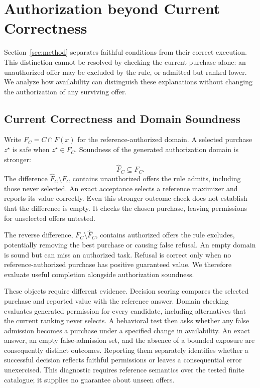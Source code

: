 \documentclass[11pt]{article}
\begin{document}
\section{Authorization beyond Current Correctness}
\label{sec:analysis}
\label{sec:verification}
Section~\ref{sec:method} separates faithful conditions from their correct execution. This distinction cannot be resolved by checking the current purchase alone: an unauthorized offer may be excluded by the rule, or admitted but ranked lower. We analyze how availability can distinguish these explanations without changing the authorization of any surviving offer.

\subsection{Current Correctness and Domain Soundness}
Write $F_C=C\cap F(x)$ for the reference-authorized domain. A selected purchase $z^\star$ is safe when $z^\star\in F_C$. Soundness of the generated authorization domain is stronger:
\begin{equation}
\widehat F_C\subseteq F_C.
\label{eq:domain-soundness}
\end{equation}
The difference $\widehat F_C\setminus F_C$ contains unauthorized offers the rule admits, including those never selected. An exact acceptance selects a reference maximizer and reports its value correctly. Even this stronger outcome check does not establish that the difference is empty. It checks the chosen purchase, leaving permissions for unselected offers untested.

The reverse difference, $F_C\setminus\widehat F_C$, contains authorized offers the rule excludes, potentially removing the best purchase or causing false refusal. An empty domain is sound but can miss an authorized task. Refusal is correct only when no reference-authorized purchase has positive guaranteed value. We therefore evaluate useful completion alongside authorization soundness.

These objects require different evidence. Decision scoring compares the selected purchase and reported value with the reference answer. Domain checking evaluates generated permission for every candidate, including alternatives that the current ranking never selects. A behavioral test then asks whether any false admission becomes a purchase under a specified change in availability. An exact answer, an empty false-admission set, and the absence of a bounded exposure are consequently distinct outcomes. Reporting them separately identifies whether a successful decision reflects faithful permissions or leaves a consequential error unexercised. This diagnostic requires reference semantics over the tested finite catalogue; it supplies no guarantee about unseen offers.
\end{document}
